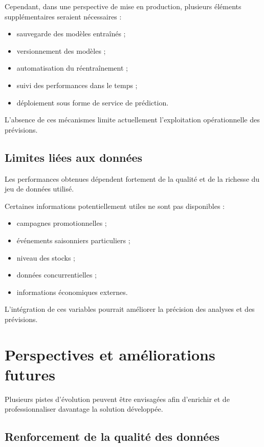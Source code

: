 \documentclass[12pt,a4paper,twoside]{report}
\begin{document}
Cependant, dans une perspective de mise en production, plusieurs éléments supplémentaires seraient nécessaires :

\begin{itemize}
    \item sauvegarde des modèles entraînés ;
    \item versionnement des modèles ;
    \item automatisation du réentraînement ;
    \item suivi des performances dans le temps ;
    \item déploiement sous forme de service de prédiction.
\end{itemize}

L'absence de ces mécanismes limite actuellement l'exploitation opérationnelle des prévisions.

\subsection{Limites liées aux données}

Les performances obtenues dépendent fortement de la qualité et de la richesse du jeu de données utilisé.

Certaines informations potentiellement utiles ne sont pas disponibles :

\begin{itemize}
    \item campagnes promotionnelles ;
    \item événements saisonniers particuliers ;
    \item niveau des stocks ;
    \item données concurrentielles ;
    \item informations économiques externes.
\end{itemize}

L'intégration de ces variables pourrait améliorer la précision des analyses et des prévisions.

\section{Perspectives et améliorations futures}

Plusieurs pistes d'évolution peuvent être envisagées afin d'enrichir et de professionnaliser davantage la solution développée.

\subsection{Renforcement de la qualité des données}
\end{document}

